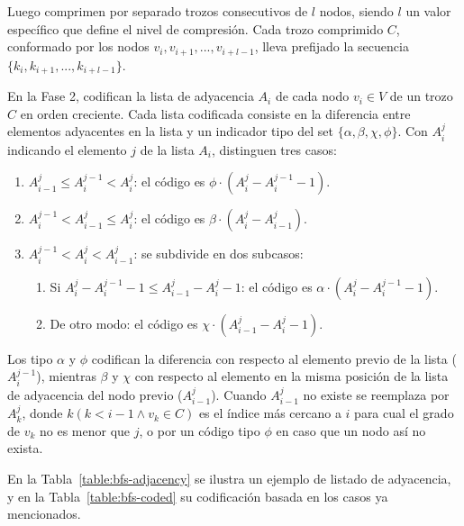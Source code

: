 

Luego comprimen por separado trozos consecutivos de $l$ nodos, siendo $l$ un valor específico que define el nivel de compresión. Cada trozo comprimido $C$, conformado por los nodos $v_{i}, v_{i + 1}, ..., v_{i + l - 1}$, lleva prefijado la secuencia $\{k_{i}, k_{i + 1}, ..., k_{i + l - 1}\}$.

En la Fase 2, codifican la lista de adyacencia $A_{i}$ de cada nodo $v_{i} \in V$ de un trozo $C$ en orden creciente. Cada lista codificada consiste en la diferencia entre elementos adyacentes en la lista y un indicador tipo del set $\{\alpha, \beta, \chi, \phi\}$. Con $A_{i}^{j}$ indicando el elemento $j$ de la lista $A_{i}$, distinguen tres casos:

\begin{enumerate}
	\item $A_{i - 1}^{j} \leq A_{i}^{j - 1} < A_{i}^{j}$: el código es $\phi \cdot (A_{i}^{j} - A_{i}^{j - 1} - 1)$.
	\item $A_{i}^{j - 1} < A_{i - 1}^{j} \leq A_{i}^{j}$: el código es $\beta \cdot (A_{i}^{j} - A_{i - 1}^{j})$.
	\item $A_{i}^{j - 1} < A_{i}^{j} < A_{i - 1}^{j}$: se subdivide en dos subcasos:
	\begin{enumerate}
		\item Si $A_{i}^{j} - A_{i}^{j - 1} - 1 \leq A_{i - 1}^{j} - A_{i}^{j} - 1$: el código es $\alpha \cdot (A_{i}^{j} - A_{i}^{j - 1} - 1)$.
		\item De otro modo: el código es $\chi \cdot (A_{i - 1}^{j} - A_{i}^{j} - 1)$.
	\end{enumerate}
\end{enumerate}

Los tipo $\alpha$ y $\phi$ codifican la diferencia con respecto al elemento previo de la lista ($A_{i}^{j - 1}$), mientras $\beta$ y $\chi$ con respecto al elemento en la misma posición de la lista de adyacencia del nodo previo ($A_{i - 1}^{j}$). Cuando $A_{i - 1}^{j}$ no existe se reemplaza por $A_{k}^{j}$, donde $k (k < i - 1 \wedge v_{k} \in C)$ es el índice más cercano a $i$ para cual el grado de $v_{k}$ no es menor que $j$, o por un código tipo $\phi$ en caso que un nodo así no exista.

En la Tabla~\ref{table:bfs-adjacency} se ilustra un ejemplo de listado de adyacencia, y en la Tabla~\ref{table:bfs-coded} su codificación basada en los casos ya mencionados.



